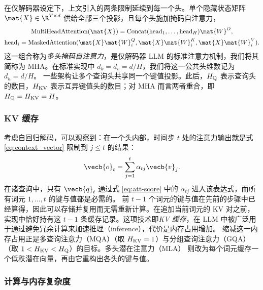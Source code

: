 在仅解码器设定下，上文引入的两条限制延续到每一个头。单个隐藏状态矩阵 $\mat{X} \in \R^{T \times d}$ 供给全部三个投影，且每个头施加掩码自注意力，
\begin{equation}
\label{eq:mha-decoder}
\begin{gathered}
\text{MultiHeadAttention}(\mat{X}) = \text{Concat}(\text{head}_1, \dots, \text{head}_H) \mat{W}^O, \\
\text{head}_i = \text{MaskedAttention}(\mat{X}\mat{W}_i^Q, \mat{X} \mat{W}_i^K, \mat{X} \mat{W}_i^V).
\end{gathered}
\end{equation}
这一组合称为\emph{多头掩码自注意力}，是仅解码器 LLM 的标准注意力机制，我们将其简称为 MHA。在标准实现中 $d_k = d_v = d/H$，我们将这一公共头维数记为 $d_h = d/H$。
一些架构让多个查询头共享同一个键值投影。此后，$H_{\rm Q}$ 表示查询头的数目，$H_{\rm KV}$ 表示互异键值头的数目；对 MHA 而言两者重合，即 $H_{\rm Q} = H_{\rm KV} = H$。

\subsubsection{KV 缓存}

考虑自回归解码，可以观察到：在一个头内部，时间步 $t$ 处的注意力输出就是式 \eqref{eq:context_vector} 限制到 $j \le t$ 的结果：
\begin{equation}
\label{eq:kv-output}
\vecb{o}_t = \sum_{j=1}^{t} \alpha_{tj} \vecb{v}_j .
\end{equation}
在诸查询中，只有 $\vecb{q}_t$ 通过式 \eqref{eq:att-score} 中的 $\alpha_{tj}$ 进入该表达式，而所有词元 $1, \ldots, t$ 的键与值都是必需的。
前 $t-1$ 个词元的键与值在先前的步骤中已经算得，因此可以存储并复用而无需重新计算。在追加当前词元的 KV 对之前，实现中恰好持有这 $t-1$ 条缓存记录。这项技术即\textit{KV 缓存}，在 LLM 中被广泛用于通过避免冗余计算来加速推理（inference），代价是内存占用增加。
缩减这一内存占用正是多查询注意力（MQA）\cite{shazeer2019mqa}（取 $H_{\rm KV} = 1$）与分组查询注意力（GQA）\cite{ainslie2023gqa}（取 $1 < H_{\rm KV} < H_{\rm Q}$）的目标。多头潜在注意力（MLA）\cite{deepseekai2024deepseekv2} 则改为每个词元缓存一个低秩潜在向量，再由它重构出各头的键与值。


\subsubsection{计算与内存复杂度}

